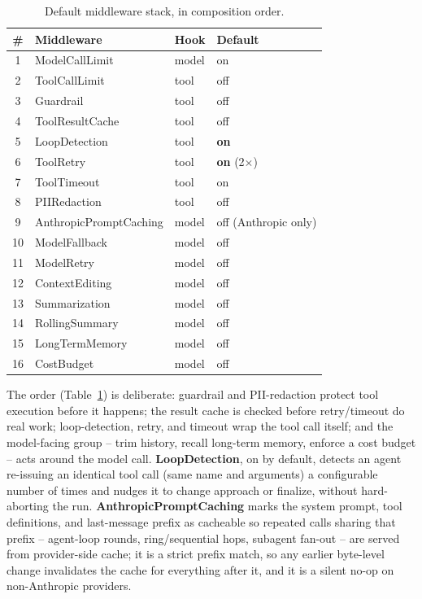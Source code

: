 \documentclass[conference]{IEEEtran}
\begin{document}
\begin{table}[t]
\centering
\footnotesize
\caption{Default middleware stack, in composition order.}
\label{tab:middleware}
\begin{tabular}{@{}clll@{}}
\toprule
\# & Middleware & Hook & Default \\
\midrule
1  & ModelCallLimit          & model & on \\
2  & ToolCallLimit           & tool  & off \\
3  & Guardrail               & tool  & off \\
4  & ToolResultCache         & tool  & off \\
5  & LoopDetection           & tool  & \textbf{on} \\
6  & ToolRetry               & tool  & \textbf{on} (2$\times$) \\
7  & ToolTimeout             & tool  & on \\
8  & PIIRedaction            & tool  & off \\
9  & AnthropicPromptCaching  & model & off (Anthropic only) \\
10 & ModelFallback           & model & off \\
11 & ModelRetry              & model & off \\
12 & ContextEditing          & model & off \\
13 & Summarization           & model & off \\
14 & RollingSummary          & model & off \\
15 & LongTermMemory          & model & off \\
16 & CostBudget              & model & off \\
\bottomrule
\end{tabular}
\end{table}

The order (Table~\ref{tab:middleware}) is deliberate: guardrail and
PII-redaction protect tool execution before it happens; the result cache
is checked before retry/timeout do real work; loop-detection, retry, and
timeout wrap the tool call itself; and the model-facing group -- trim
history, recall long-term memory, enforce a cost budget -- acts around the
model call. \textbf{LoopDetection}, on by default, detects an agent
re-issuing an identical tool call (same name and arguments) a configurable
number of times and nudges it to change approach or finalize, without
hard-aborting the run. \textbf{AnthropicPromptCaching} marks the system
prompt, tool definitions, and last-message prefix as cacheable so repeated
calls sharing that prefix -- agent-loop rounds, ring/sequential hops,
subagent fan-out -- are served from provider-side cache; it is a strict
prefix match, so any earlier byte-level change invalidates the cache for
everything after it, and it is a silent no-op on non-Anthropic providers.
\end{document}

